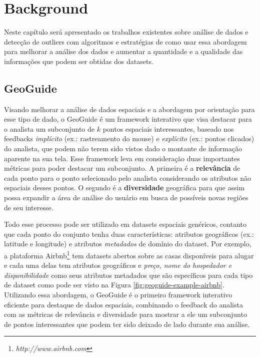 \chapter{Background}
\label{chap:background}

Neste capítulo será apresentado os trabalhos existentes sobre análise de dados e detecção de outliers com algoritmos e estratégias de como usar essa abordagem para melhorar a análise dos dados e aumentar a quantidade e a qualidade das informações que podem ser obtidas dos datasets.

\section{GeoGuide}

Visando melhorar a análise de dados espaciais e a abordagem por orientação para esse tipo de dado, o GeoGuide \cite{omidvarTehrani2017} é um framework interativo que visa destacar para o analista um subconjunto de $k$ pontos espaciais interessantes, baseado nos feedbacks \textit{implícito} (ex.: rastreamento do mouse) e \textit{explícito} (ex.: pontos clicados) do analista, que podem não terem sido vistos dado o montante de informação aparente na sua tela. Esse framework leva em consideração duas importantes métricas para poder destacar um subconjunto. A primeira é a \textbf{relevância} de cada ponto para o ponto selecionado pelo analista considerando os atributos não espaciais desses pontos. O segundo é a \textbf{diversidade} geográfica para que assim possa expandir a área de análise do usuário em busca de possíveis novas regiões de seu interesse.

Todo esse processo pode ser utilizado em datasets espaciais genéricos, contanto que cada ponto do conjunto tenha duas características: atributos geográficos (ex.: latitude e longitude) e atributos \textit{metadados} de domínio do dataset. Por exemplo, a plataforma Airbnb\footnote{\it http://www.airbnb.com} tem datasets abertos sobre as casas disponíveis para alugar e cada uma delas tem atributos geográficos e \textit{preço, nome do hospedador e disponibilidade} como seus atributos metadados que são específicos para cada tipo de dataset como pode ser visto na Figura \ref{fig:geoguide-example-airbnb}. Utilizando essa abordagem, o GeoGuide é o primeiro framework interativo eficiente para destaque de dados espaciais, combinando o feedback do analista com as métricas de relevância e diversidade para mostrar a ele um subconjunto de pontos interessantes que podem ter sido deixado de lado durante sua análise.

